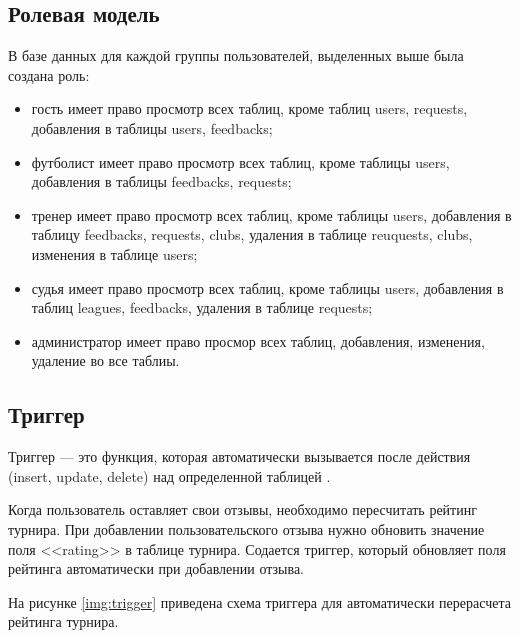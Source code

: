 \subsection{Ролевая модель}
В базе данных для каждой группы пользователей, выделенных выше была создана роль:
\begin{itemize}
	\item гость имеет право просмотр всех таблиц, кроме таблиц users, requests, добавления в таблицы users, feedbacks;
	\item футболист имеет право просмотр всех таблиц, кроме таблицы users, добавления в таблицы feedbacks, requests;
	\item тренер имеет право просмотр всех таблиц, кроме таблицы users, добавления в таблицу feedbacks, requests, clubs, удаления в таблице reuquests, clubs, изменения в таблице users;
	\item судья имеет право просмотр всех таблиц, кроме таблицы users, добавления в таблиц leagues, feedbacks, удаления в таблице requests;
	\item администратор имеет право просмор всех таблиц, добавления, изменения, удаление во все таблиы.
\end{itemize}

\subsection{Триггер}

Триггер --- это функция, которая автоматически вызывается после действия (insert, update, delete) над определенной таблицей \cite{light-model}. 

Когда пользователь оставляет свои отзывы, необходимо пересчитать рейтинг турнира.
При добавлении пользовательского отзыва нужно обновить значение поля <<rating>> в таблице турнира. Содается триггер, который обновляет поля рейтинга автоматически при добавлении отзыва.

На рисунке \ref{img:trigger} приведена схема триггера для автоматически перерасчета рейтинга турнира.

